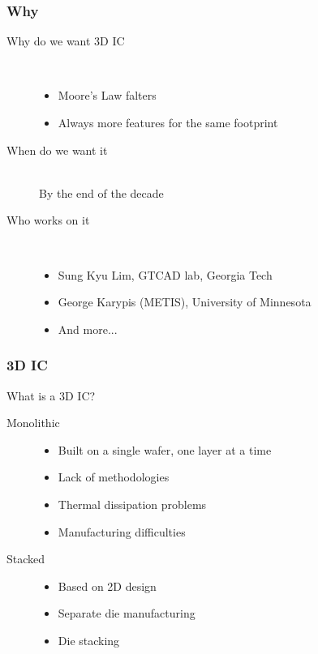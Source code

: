 \documentclass[xcolor={x11names, rgb, usenames, dvipsnames}]{beamer}
\author{Quentin Delhaye}
\title[Partitioning for 3D stacking]{Automated System Partitioning \\ for Efficient 3D Circuit Integration \\\rule{2cm}{0.3pt} ~\\ Work presentation}
\institute[BEAMS]{Université Libre de Bruxelles}
\date{}
\begin{document}
\begin{frame}
\titlepage
\end{frame}


\begin{frame}
  \frametitle{Why}
  \begin{description}
    \item[Why do we want 3D IC]~\\
      \begin{itemize}
        \item Moore's Law falters
        \item Always more features for the same footprint
      \end{itemize}
    \item[When do we want it]~\\
        By the end of the decade
    \item[Who works on it]~\\
      \begin{itemize}
        \item Sung Kyu Lim, GTCAD lab, Georgia Tech
        \item George Karypis (METIS), University of Minnesota
        \item And more...
      \end{itemize}
  \end{description}
\end{frame}

\begin{frame}
  \frametitle{3D IC}
  What is a 3D IC?

  \begin{description}
    \item[Monolithic]
      \begin{itemize}
        \item Built on a single wafer, one layer at a time
        \item Lack of methodologies
        \item Thermal dissipation problems
        \item Manufacturing difficulties
      \end{itemize}
    \item[Stacked]
      \begin{itemize}
        \item Based on 2D design
        \item Separate die manufacturing
        \item Die stacking
      \end{itemize}
  \end{description}
\end{frame}
\end{document}
